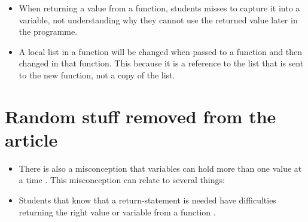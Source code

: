 \documentclass[onecolumn]{article}
\begin{document}
\begin{itemize}
    \item When returning a value from a function, students misses to 
capture it into a variable, not understanding why they cannot use the 
returned value later in the programme. 
    \item A local list in a function will be changed when passed to a 
function and then changed in that function. This because it is a 
reference to the list that is sent to the new function, not a copy of 
the list. 
\end{itemize}

\section{Random stuff removed from the article}

\begin{itemize}
    \item There is also a misconception that variables can hold more than 
one value at a time \parencite{Doukakis2007}. This misconception can 
relate to several things:

    \item Students that know that a return-statement is needed have 
difficulties returning the right value or variable from a function 
\parencite{KumarVeerasamy2016}. 

\end{itemize}
\end{document}
